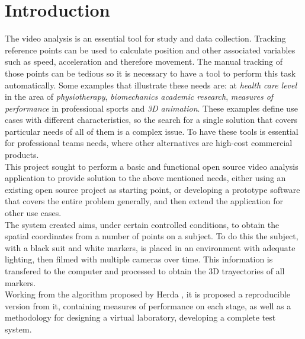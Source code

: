 \section{Introduction}

The video analysis is an essential tool for study and data collection. Tracking reference points can be used to calculate position and other associated variables such as speed, acceleration and therefore movement.
The manual tracking of those points can be tedious so it is necessary to have a tool to perform this task automatically. 
Some examples that illustrate these needs are: at \emph{health care level} in the area of \emph{physiotherapy}, \emph{biomechanics academic research},
\emph{measures of performance} in professional sports and \emph{3D animation}.
These examples define use cases with different characteristics, so the search for a single solution that covers particular needs of all of them is a complex issue. To have these tools is essential for professional teams needs, where other alternatives are high-cost commercial products.\\
\hspace*{0.5cm}This project sought to perform a basic and functional open source video analysis application to provide solution to the above mentioned needs, either using an existing open source project as starting point, or developing a prototype software that covers the entire problem generally, and then extend the application for other use cases.\\
\hspace*{0.5cm}The system created aims, under certain controlled conditions, to obtain the spatial coordinates from a number of points on a subject. To do this the subject, with a black suit and white markers, is placed in an environment with adequate lighting, then filmed with multiple cameras over time. This information is transfered to the computer and processed to obtain the 3D trayectories of all markers.\\
\hspace*{0.5cm}Working from the algorithm proposed by Herda \cite{herda}, it is proposed a reproducible version from it, containing measures of performance on each stage, as well as a methodology for designing a virtual laboratory, developing a complete test system.

